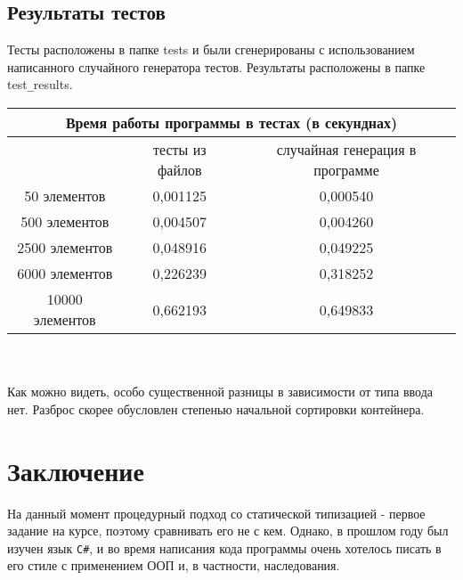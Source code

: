\documentclass[a4paper]{article}
\begin{document}
\subsection*{Результаты тестов}
Тесты расположены в папке tests и были сгенерированы с использованием написанного случайного генератора тестов. Результаты расположены в папке test\verb|_|results.

\begin{tabular}{ |c|c|c| }   
    \hline
    \multicolumn{3}{|c|}{Время работы программы в тестах (в секунднах)}\\
    \hline
    & тесты из файлов & случайная генерация в программе \\
    \hline
    50 элементов & 0,001125 & 0,000540\\
    \hline
    500 элементов & 0,004507 & 0,004260\\
    \hline
    2500 элементов & 0,048916 & 0,049225\\
    \hline
    6000 элементов & 0,226239 & 0,318252\\
    \hline
    10000 элементов & 0,662193 & 0,649833\\
    \hline
\end{tabular}\\\\
Как можно видеть, особо существенной разницы в зависимости от типа ввода нет. Разброс скорее обусловлен степенью начальной сортировки контейнера.
\section*{Заключение}
На данный момент процедурный подход со статической типизацией - первое задание на курсе, поэтому сравнивать его не с кем. Однако, в прошлом году был изучен язык \verb|C#|, и во время написания кода программы очень хотелось писать в его стиле с применением ООП и, в частности, наследования.
\end{document}

